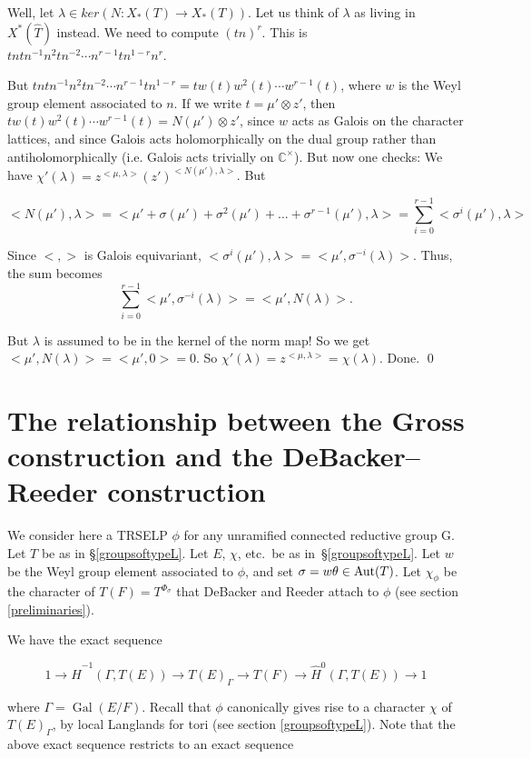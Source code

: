 \documentclass[11pt]{amsart}
\theoremstyle{plain}
\theoremstyle{definition}
\DeclareMathOperator{\Gal}{Gal}
\begin{document}
Well, let $\lambda \in ker(N : X_*(T) \rightarrow X_*(T))$.  Let us
think of $\lambda$ as living in $X^*(\hat{T})$ instead.  We need to
compute $(tn)^r$.  This is $t ntn^{-1} n^2 t n^{-2} \cdots n^{r-1} t n^{1-r} n^r$.

But $t ntn^{-1} n^2 t n^{-2} \cdots n^{r-1} t n^{1-r} = t w(t) w^2(t) \cdots w^{r-1}(t)$,
where $w$ is the Weyl group element associated to $n$.  If we write
$t = \mu' \otimes z'$, then $t w(t) w^2(t) \cdots w^{r-1}(t) = N(\mu' ) \otimes z'$,
since $w$ acts as Galois on the character lattices, and since Galois
acts holomorphically on the dual group rather than antiholomorphically
(i.e. Galois acts trivially on $\mathbb{C}^\times$).  But now one checks:
We have $\chi'(\lambda) = z^{<\mu, \lambda>} (z' )^{<N(\mu'), \lambda>}$.  But

$$<N(\mu'), \lambda> = < \mu' + \sigma(\mu') + \sigma^2(\mu') + ... + \sigma^{r-1}(\mu'), \lambda>
  = \displaystyle\sum_{i=0}^{r-1} < \sigma^i(\mu'), \lambda >$$

Since $< , >$ is Galois equivariant, $<\sigma^i(\mu'), \lambda> =
<\mu', \sigma^{-i}(\lambda)>$.  Thus, the sum
becomes
$$\displaystyle\sum_{i=0}^{r-1} <\mu', \sigma^{-i}(\lambda)> = <\mu', N(\lambda)>.$$

But $\lambda$ is assumed to be in the kernel of the norm map!  So we
get $<\mu', N(\lambda)> = <\mu', 0> = 0$.  So
$\chi'(\lambda) = z^{<\mu, \lambda>} = \chi(\lambda)$.  Done.
\qed

\section{The relationship between the Gross construction and the DeBacker--Reeder construction}\label{grossdebackerreeder}

We consider here a TRSELP $\phi$ for any unramified connected
reductive group G.  Let $T$ be as in \S\ref{groupsoftypeL}.  Let $E$,
$\chi$, etc.~be as in~\S\ref{groupsoftypeL}.  Let $w$ be the Weyl
group element associated to $\phi$, and set $\sigma = w \theta\in {\rm Aut}(T)$.
Let $\chi_{\phi}$ be the character of $T(F) = T^{\Phi_{\sigma}}$ that
DeBacker and Reeder attach to $\phi$ (see section
\ref{preliminaries}).

We have the exact sequence

$$1 \rightarrow \hat{H}^{-1}(\Gamma, T(E)) \rightarrow T(E)_{\Gamma} \rightarrow T(F)
  \rightarrow \hat{H}^0(\Gamma, T(E)) \rightarrow 1$$

where $\Gamma = \Gal(E/F)$.  Recall that $\phi$ canonically gives
rise to a character $\chi$ of $T(E)_{\Gamma}$, by local Langlands
for tori (see section \ref{groupsoftypeL}).  Note that the above
exact sequence restricts to an exact sequence
\end{document}
